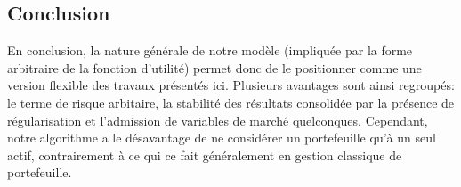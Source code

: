 \subsection{Conclusion}


En conclusion, la nature générale de notre modèle (impliquée par la forme arbitraire de la
fonction d'utilité) permet donc de le positionner comme une version flexible des travaux
présentés ici. Plusieurs avantages sont ainsi regroupés: le terme de risque arbitaire, la
stabilité des résultats consolidée par la présence de régularisation et l'admission de
variables de marché quelconques. Cependant, notre algorithme a le désavantage de ne
considérer un portefeuille qu'à un seul actif, contrairement à ce qui ce fait généralement
en gestion classique de portefeuille.



